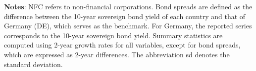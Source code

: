 \begin{table}[htbp]
\vspace{0.3cm}
\footnotesize
\parbox{0.95\textwidth}{\textbf{Notes}: NFC refers to non-financial corporations. Bond spreads are defined as the difference between the 10-year sovereign bond yield of each country and that of Germany (DE), which serves as the benchmark. For Germany, the reported series corresponds to the 10-year sovereign bond yield. Summary statistics are computed using 2-year growth rates for all variables, except for bond spreads, which are expressed as 2-year differences. The abbreviation sd denotes the standard deviation.}
\end{table}
